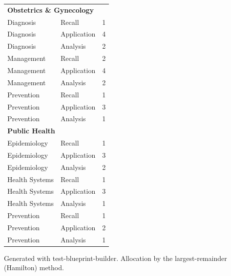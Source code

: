 \documentclass[11pt,a4paper]{article}
\begin{document}
\begin{longtable}{llr}
\multicolumn{3}{l}{\textbf{Obstetrics \& Gynecology}} \\
\quad Diagnosis & Recall & 1 \\
\quad Diagnosis & Application & 4 \\
\quad Diagnosis & Analysis & 2 \\
\quad Management & Recall & 2 \\
\quad Management & Application & 4 \\
\quad Management & Analysis & 2 \\
\quad Prevention & Recall & 1 \\
\quad Prevention & Application & 3 \\
\quad Prevention & Analysis & 1 \\
\multicolumn{3}{l}{\textbf{Public Health}} \\
\quad Epidemiology & Recall & 1 \\
\quad Epidemiology & Application & 3 \\
\quad Epidemiology & Analysis & 2 \\
\quad Health Systems & Recall & 1 \\
\quad Health Systems & Application & 3 \\
\quad Health Systems & Analysis & 1 \\
\quad Prevention & Recall & 1 \\
\quad Prevention & Application & 2 \\
\quad Prevention & Analysis & 1 \\
\bottomrule
\end{longtable}

\vfill
{\footnotesize\color{gray} Generated with test-blueprint-builder. Allocation by the largest-remainder (Hamilton) method.}
\end{document}
